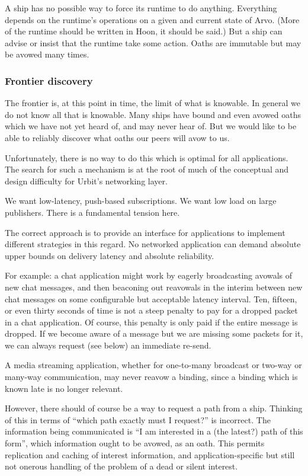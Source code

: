 \documentclass[twoside]{article}
\begin{document}
A ship has no possible way to force its runtime to do anything. Everything depends on the runtime's operations on a given and current state of Arvo. (More of the runtime should be written in Hoon, it should be said.) But a ship can advise or insist that the runtime take some action. Oaths are immutable but may be avowed many times.

\subsubsection{Frontier discovery}

The frontier is, at this point in time, the limit of what is knowable. In general we do not know all that is knowable. Many ships have bound and even avowed oaths which we have not yet heard of, and may never hear of. But we would like to be able to reliably discover what oaths our peers will avow to us.

Unfortunately, there is no way to do this which is optimal for all applications. The search for such a mechanism is at the root of much of the conceptual and design difficulty for Urbit's networking layer.

We want low-latency, push-based subscriptions. We want low load on large publishers. There is a fundamental tension here.

The correct approach is to provide an interface for applications to implement different strategies in this regard. No networked application can demand absolute upper bounds on delivery latency and absolute reliability.

For example: a chat application might work by eagerly broadcasting avowals of new chat messages, and then beaconing out reavowals in the interim between new chat messages on some configurable but acceptable latency interval. Ten, fifteen, or even thirty seconds of time is not a steep penalty to pay for a dropped packet in a chat application. Of course, this penalty is only paid if the entire message is dropped. If we become aware of a message but we are missing some packets for it, we can always request (see below) an immediate re-send.

A media streaming application, whether for one-to-many broadcast or two-way or many-way communication, may never reavow a binding, since a binding which is known late is no longer relevant.

However, there should of course be a way to request a path from a ship. Thinking of this in terms of ``which path exactly must I request?'' is incorrect. The information being communicated is ``I am interested in a (the latest?) path of this form'', which information ought to be avowed, as an oath. This permits replication and caching of interest information, and application-specific but still not onerous handling of the problem of a dead or silent interest.
\end{document}
